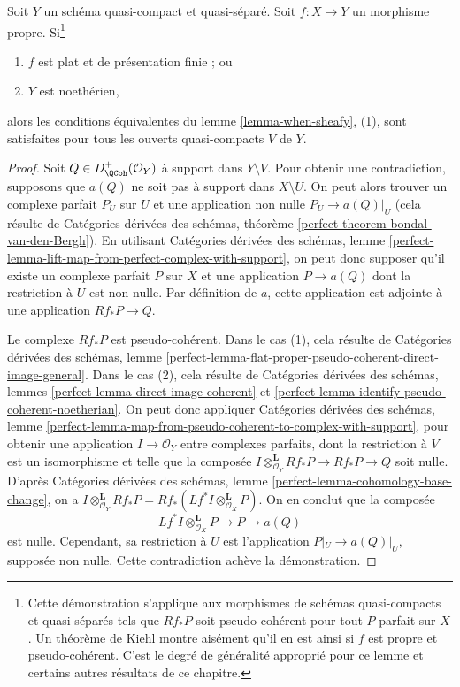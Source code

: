\begin{lemma}
\label{lemma-proper-noetherian}
Soit $Y$ un schéma quasi-compact et quasi-séparé. Soit $f : X \to Y$ un morphisme propre. Si\footnote{Cette démonstration s'applique aux morphismes de schémas quasi-compacts et quasi-séparés tels que $Rf_*P$ soit pseudo-cohérent pour tout $P$ parfait sur $X$. Un théorème de Kiehl \cite{Kiehl} montre aisément qu'il en est ainsi si $f$ est propre et pseudo-cohérent. C'est le degré de généralité approprié pour ce lemme et certains autres résultats de ce chapitre.}
\begin{enumerate}
\item $f$ est plat et de présentation finie ; ou
\item $Y$ est noethérien,
\end{enumerate}
alors les conditions équivalentes du lemme \ref{lemma-when-sheafy}, (1), sont satisfaites pour tous les ouverts quasi-compacts $V$ de $Y$.
\end{lemma}

\begin{proof}
Soit $Q \in D^+_\QCoh(\mathcal{O}_Y)$ à support dans $Y \setminus V$. Pour obtenir une contradiction, supposons que $a(Q)$ ne soit pas à support dans $X \setminus U$. On peut alors trouver un complexe parfait $P_U$ sur $U$ et une application non nulle $P_U \to a(Q)|_U$ (cela résulte de Catégories dérivées des schémas, théorème \ref{perfect-theorem-bondal-van-den-Bergh}). En utilisant Catégories dérivées des schémas, lemme \ref{perfect-lemma-lift-map-from-perfect-complex-with-support}, on peut donc supposer qu'il existe un complexe parfait $P$ sur $X$ et une application $P \to a(Q)$ dont la restriction à $U$ est non nulle. Par définition de $a$, cette application est adjointe à une application $Rf_*P \to Q$.

\medskip\noindent
Le complexe $Rf_*P$ est pseudo-cohérent. Dans le cas (1), cela résulte de Catégories dérivées des schémas, lemme \ref{perfect-lemma-flat-proper-pseudo-coherent-direct-image-general}. Dans le cas (2), cela résulte de Catégories dérivées des schémas, lemmes \ref{perfect-lemma-direct-image-coherent} et \ref{perfect-lemma-identify-pseudo-coherent-noetherian}. On peut donc appliquer Catégories dérivées des schémas, lemme \ref{perfect-lemma-map-from-pseudo-coherent-to-complex-with-support}, pour obtenir une application $I \to \mathcal{O}_Y$ entre complexes parfaits, dont la restriction à $V$ est un isomorphisme et telle que la composée $I \otimes^\mathbf{L}_{\mathcal{O}_Y} Rf_*P \to Rf_*P \to Q$ soit nulle. D'après Catégories dérivées des schémas, lemme \ref{perfect-lemma-cohomology-base-change}, on a $I \otimes^\mathbf{L}_{\mathcal{O}_Y} Rf_*P =
Rf_*(Lf^*I \otimes^\mathbf{L}_{\mathcal{O}_X} P)$. On en conclut que la composée
$$
Lf^*I \otimes^\mathbf{L}_{\mathcal{O}_X} P \to P \to a(Q)
$$
est nulle. Cependant, sa restriction à $U$ est l'application $P|_U \to a(Q)|_U$, supposée non nulle. Cette contradiction achève la démonstration.
\end{proof}












